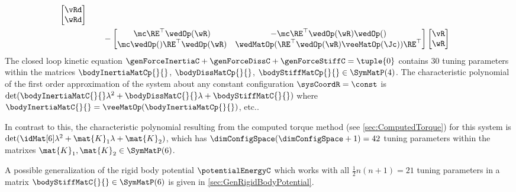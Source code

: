 \begin{subequations}
\begin{align}
 \begin{bmatrix} \vRd \\ \wRd \end{bmatrix}
\nonumber\\
 &\qquad
 - \begin{bmatrix} \mc\RE^\top\wedOp(\wR) & -\mc\RE^\top\wedOp(\wR)\wedOp(\sc) \\ \mc\wedOp(\sc)\RE^\top\wedOp(\wR) & \wedMatOp(\RE^\top\wedOp(\wR)\veeMatOp(\Jc))\RE^\top \end{bmatrix}  \begin{bmatrix} \vR \\ \wR \end{bmatrix}
\end{align}
\end{subequations}
The closed loop kinetic equation $\genForceInertiaC + \genForceDissC + \genForceStiffC = \tuple{0}$ contains 30 tuning parameters within the matrices $\bodyInertiaMatCp{}{}$, $\bodyDissMatCp{}{}$, $\bodyStiffMatCp{}{} \in \SymMatP(4)$.
The characteristic polynomial of the first order approximation of the system about any constant configuration $\sysCoordR=\const$ is $\det(\bodyInertiaMatC{}{} \lambda^2 + \bodyDissMatC{}{} \lambda + \bodyStiffMatC{}{})$ where $\bodyInertiaMatC{}{} = \veeMatOp(\bodyInertiaMatCp{}{})$, etc..


In contrast to this, the characteristic polynomial resulting from the computed torque method (see \autoref{sec:ComputedTorque}) for this system is $\det(\idMat[6] \lambda^2 + \mat{K}_1 \lambda + \mat{K}_2)$, which has $\dimConfigSpace(\dimConfigSpace+1) = 42$ tuning parameters within the matrixes $\mat{K}_1,\mat{K}_2\in\SymMatP(6)$.


A possible generalization of the rigid body potential $\potentialEnergyC$ which works with all $\tfrac{1}{2}n(n+1) = 21$ tuning parameters in a matrix $\bodyStiffMatC{}{} \in \SymMatP(6)$ is given in \autoref{sec:GenRigidBodyPotential}.

